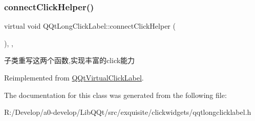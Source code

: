 \subsubsection{\texorpdfstring{connect\+Click\+Helper()}{connectClickHelper()}}
{\footnotesize\ttfamily virtual void Q\+Qt\+Long\+Click\+Label\+::connect\+Click\+Helper (\begin{DoxyParamCaption}{ }\end{DoxyParamCaption})\hspace{0.3cm}{\ttfamily [inline]}, {\ttfamily [protected]}, {\ttfamily [virtual]}}

子类重写这两个函数,实现丰富的click能力 

Reimplemented from \mbox{\hyperlink{class_q_qt_virtual_click_label_a6e008887a4f2d5287e329a53caf8222c}{Q\+Qt\+Virtual\+Click\+Label}}.



The documentation for this class was generated from the following file\+:\begin{DoxyCompactItemize}
\item 
R\+:/\+Develop/a0-\/develop/\+Lib\+Q\+Qt/src/exquisite/clickwidgets/qqtlongclicklabel.\+h\end{DoxyCompactItemize}
